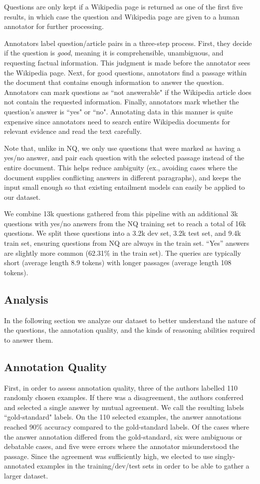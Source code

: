 Questions are only kept if a Wikipedia page is returned as one of the first five results, in which case the question and Wikipedia page are given to a human annotator for further processing.

Annotators label question/article pairs in a three-step process. First, they decide if the question is \textit{good}, meaning it is comprehensible, unambiguous, and requesting factual information. This judgment is made before the annotator sees the Wikipedia page. Next, for good questions, annotators find a passage within the document that contains enough information to answer the question. Annotators can mark questions as ``not answerable" if the Wikipedia article does not contain the requested information. Finally, annotators mark whether the question's answer is ``yes" or ``no". Annotating data in this manner is quite expensive since annotators need to search entire Wikipedia documents for relevant evidence and read the text carefully.

Note that, unlike in NQ, we only use questions that were marked as having a yes/no answer, and pair each question with the selected passage instead of the entire document. This helps reduce ambiguity (ex., avoiding cases where the document supplies conflicting answers in different paragraphs), and keeps the input small enough so that existing entailment models can easily be applied to our dataset.

We combine 13k questions gathered from this pipeline with an additional 3k questions with yes/no answers from the NQ training set to reach a total of 16k questions. We split these questions into a 3.2k dev set, 3.2k test set, and 9.4k train set, ensuring questions from NQ are always in the train set. ``Yes'' answers are slightly more common (62.31\% in the train set). The queries are typically short (average length 8.9 tokens) with longer passages (average length 108 tokens).

\subsection{Analysis}

In the following section we analyze our dataset to better understand the nature of the questions, the annotation quality, and the kinds of reasoning abilities required to answer them.

\subsection{Annotation Quality} First, in order to assess annotation quality, three of the authors labelled 110 randomly chosen examples. If there was a disagreement, the authors conferred and selected a single answer by mutual agreement. We call the resulting labels ``gold-standard" labels. On the 110 selected examples, the answer annotations reached 90\% accuracy compared to the gold-standard labels. Of the cases where the answer annotation differed from the gold-standard, six were ambiguous or debatable cases, and five were errors where the annotator misunderstood the passage. Since the agreement was sufficiently high, we elected to use singly-annotated examples in the training/dev/test sets in order to be able to gather a larger dataset.

